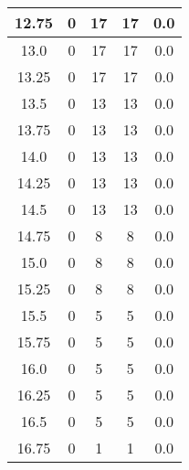 \documentclass[letterpaper, 12pt]{article}
\begin{document}
\begin{longtable}{|c|c|c|c|c|}
\hline
12.75 & 0 & 17 & 17 & 0.0 \\
\hline
13.0 & 0 & 17 & 17 & 0.0 \\
\hline
13.25 & 0 & 17 & 17 & 0.0 \\
\hline
13.5 & 0 & 13 & 13 & 0.0 \\
\hline
13.75 & 0 & 13 & 13 & 0.0 \\
\hline
14.0 & 0 & 13 & 13 & 0.0 \\
\hline
14.25 & 0 & 13 & 13 & 0.0 \\
\hline
14.5 & 0 & 13 & 13 & 0.0 \\
\hline
14.75 & 0 & 8 & 8 & 0.0 \\
\hline
15.0 & 0 & 8 & 8 & 0.0 \\
\hline
15.25 & 0 & 8 & 8 & 0.0 \\
\hline
15.5 & 0 & 5 & 5 & 0.0 \\
\hline
15.75 & 0 & 5 & 5 & 0.0 \\
\hline
16.0 & 0 & 5 & 5 & 0.0 \\
\hline
16.25 & 0 & 5 & 5 & 0.0 \\
\hline
16.5 & 0 & 5 & 5 & 0.0 \\
\hline
16.75 & 0 & 1 & 1 & 0.0 \\
\hline
\end{longtable}
\end{document}
